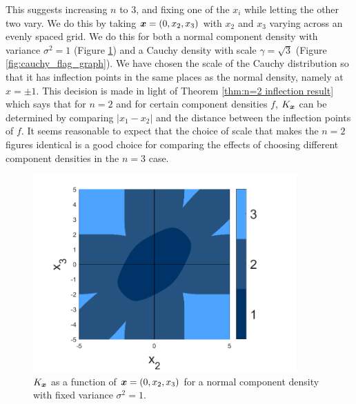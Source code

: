 	This suggests increasing $n$ to $3$, and fixing one of the $x_i$ while letting the other two vary. We do this by taking ${\bm{{x}}} = (0, x_2, x_3)$ with $x_2$ and $x_3$ varying across an evenly spaced grid. We do this for both a normal component density with variance $\sigma^2 = 1$ (Figure \ref{fig:normal_flag_graph}) and a Cauchy density with scale $\gamma = \sqrt{3}$ (Figure \ref{fig:cauchy_flag_graph}). We have chosen the scale of the Cauchy distribution so that it has inflection points in the same places as the normal density, namely at $x = \pm 1$. This decision is made in light of Theorem \ref{thm:n=2 inflection result} which says that for $n = 2$ and for certain component densities $f$, $K_{\bm{{x}}}$ can be determined by comparing $|x_1 - x_2|$ and the distance between the inflection points of $f$. It seems reasonable to expect that the choice of scale that makes the $n = 2$ figures identical is a good choice for comparing the effects of choosing different component densities in the $n = 3$ case.

	
	\begin{figure}
		\centering
		\includegraphics[width=0.9\textwidth]{normal_flag_graph.png}
		\caption{$K_{\bm{{x}}}$ as a function of ${\bm{{x}}} = (0, x_2, x_3)$ for a normal component density with fixed variance $\sigma^2 = 1$.}\label{fig:normal_flag_graph}
	\end{figure}


